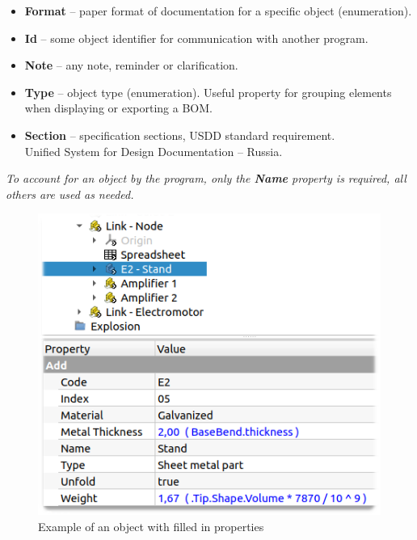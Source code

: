 \documentclass[a4paper,12pt]{article}
\begin{document}
\begin{itemize}
	\item \textbf{Format} -- paper format of documentation for a specific object (enumeration).
	\item \textbf{Id} -- some object identifier for communication with another program.
	\item \textbf{Note} -- any note, reminder or clarification.
	\item \textbf{Type} -- object type (enumeration). Useful property for grouping elements when displaying or exporting a BOM.
	\item \textbf{Section} -- specification sections, USDD standard requirement.\\Unified System for Design Documentation -- Russia.
\end{itemize}

\begin{center}\emph{To account for an object by the program, only the \textbf{Name} property is required, all others are used as needed.}\end{center}

\begin{figure}[htp]
	\centering
	\includegraphics[scale=0.8]{img/properties.png}
	\caption{Example of an object with filled in properties}
	\label{sec:properties}
\end{figure}

\pagebreak
\end{document}
